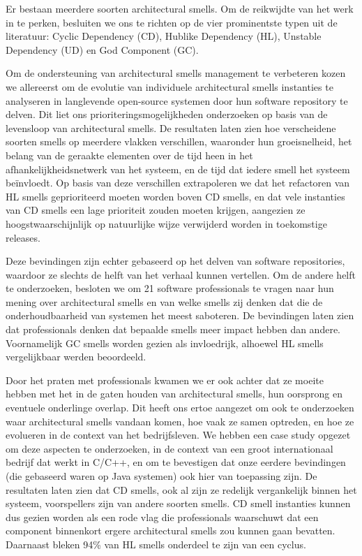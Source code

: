 {Er bestaan meerdere soorten architectural smells. Om de reikwijdte van het werk in te perken, besluiten we ons te richten op de vier prominentste typen uit de literatuur: Cyclic Dependency (CD), Hublike Dependency (HL), Unstable Dependency (UD) en God Component (GC).

Om de ondersteuning van architectural smells management te verbeteren kozen we allereerst om de evolutie van individuele architectural smells instanties te analyseren in langlevende open-source systemen door hun software repository te delven. Dit liet ons prioriteringsmogelijkheden onderzoeken op basis van de levensloop van architectural smells. De resultaten laten zien hoe verscheidene soorten smells op meerdere vlakken verschillen, waaronder hun groeisnelheid, het belang van de geraakte elementen over de tijd heen in het afhankelijkheidsnetwerk van het systeem, en de tijd dat iedere smell het systeem beïnvloedt. Op basis van deze verschillen extrapoleren we dat het refactoren van HL smells geprioriteerd moeten worden boven CD smells, en dat vele instanties van CD smells een lage prioriteit zouden moeten krijgen, aangezien ze hoogstwaarschijnlijk op natuurlijke wijze verwijderd worden in toekomstige releases.

Deze bevindingen zijn echter gebaseerd op het delven van software repositories, waardoor ze slechts de helft van het verhaal kunnen vertellen. Om de andere helft te onderzoeken, besloten we om 21 software professionals te vragen naar hun mening over architectural smells en van welke smells zij denken dat die de onderhoudbaarheid van systemen het meest saboteren. De bevindingen laten zien dat professionals denken dat bepaalde smells meer impact hebben dan andere. Voornamelijk GC smells worden gezien als invloedrijk, alhoewel HL smells vergelijkbaar werden beoordeeld.

Door het praten met professionals kwamen we er ook achter dat ze moeite hebben met het in de gaten houden van architectural smells, hun oorsprong en eventuele onderlinge overlap. Dit heeft ons ertoe aangezet om ook te onderzoeken waar architectural smells vandaan komen, hoe vaak ze samen optreden, en hoe ze evolueren in de context van het bedrijfsleven. We hebben een case study opgezet om deze aspecten te onderzoeken, in de context van een groot internationaal bedrijf dat werkt in C/C++, en om te bevestigen dat onze eerdere bevindingen (die gebaseerd waren op Java systemen) ook hier van toepassing zijn. De resultaten laten zien dat CD smells, ook al zijn ze redelijk vergankelijk binnen het systeem, voorspellers zijn van andere soorten smells. CD smell instanties kunnen dus gezien worden als een rode vlag die professionals waarschuwt dat een component binnenkort ergere architectural smells zou kunnen gaan bevatten. Daarnaast bleken 94\% van HL smells onderdeel te zijn van een cyclus. 

}
